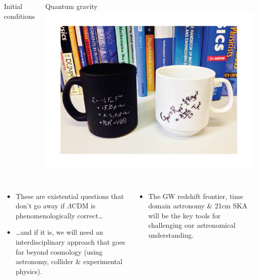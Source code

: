 \documentclass[aspectratio=169]{beamer}
\begin{document}
\begin{frame}
\begin{columns}
\begin{block}{Initial conditions}
        \end{block}
        \begin{block}{Quantum gravity}
            \includegraphics[width=\textwidth]{figures/quantum_gravity.jpeg}
        \end{block}
    \end{columns}
    \begin{columns}
        \begin{itemize}
            \item These are existential questions that don't go away if $\Lambda$CDM is phenomenologically correct\ldots
            \item \ldots and if it is, we will need an interdisciplinary approach that goes far beyond cosmology (using astronomy, collider \& experimental physics).
        \end{itemize}
        \begin{itemize}
            \item The GW redshift frontier, time domain astronomy \& 21cm SKA will be the key tools for challenging our astronomical understanding.
        \end{itemize}
    \end{columns}
\end{frame}
\end{document}
